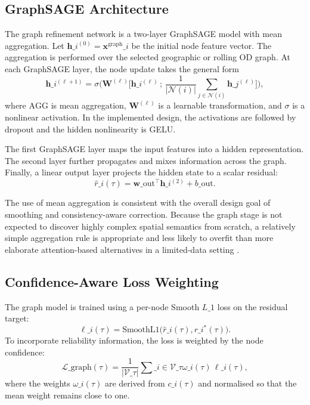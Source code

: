 \documentclass[12pt,a4paper]{report}
\begin{document}
\subsection{GraphSAGE Architecture}

The graph refinement network is a two-layer GraphSAGE model with mean aggregation. Let \(\mathbf{h}\_i^{(0)} = \mathbf{x}^{\text{graph}}\_i\) be the initial node feature vector.
The aggregation is performed over the selected geographic or rolling OD graph. At each GraphSAGE layer, the node update takes the general form
\[
\mathbf{h}\_i^{(\ell+1)}
=
\sigma\Big(
\mathbf{W}^{(\ell)}
\big[
\mathbf{h}\_i^{(\ell)} \, ; \,
\frac{1}{|\mathcal{N}(i)|}\sum_{j\in\mathcal{N}(i)} \mathbf{h}\_j^{(\ell)}
\big]
\Big),
\]
where \(\text{AGG}\) is mean aggregation, \(\mathbf{W}^{(\ell)}\) is a learnable transformation, and \(\sigma\) is a nonlinear activation. In the implemented design, the activations are followed by dropout and the hidden nonlinearity is GELU.

The first GraphSAGE layer maps the input features into a hidden representation. The second layer further propagates and mixes information across the graph. Finally, a linear output layer projects the hidden state to a scalar residual:
\[
\hat{r}\_i(\tau) = \mathbf{w}\_{\text{out}}^\top \mathbf{h}\_i^{(2)} + b\_{\text{out}}.
\]

The use of mean aggregation is consistent with the overall design goal of smoothing and consistency-aware correction. Because the graph stage is not expected to discover highly complex spatial semantics from scratch, a relatively simple aggregation rule is appropriate and less likely to overfit than more elaborate attention-based alternatives in a limited-data setting \cite{hamilton2017graphsage,jiang2022survey}.

\subsection{Confidence-Aware Loss Weighting}

The graph model is trained using a per-node Smooth \(L\_1\) loss on the residual target:
\[
\ell\_i(\tau)
=
\text{SmoothL1}\big(\hat{r}\_i(\tau), r\_i^*(\tau)\big).
\]
To incorporate reliability information, the loss is weighted by the node confidence:
\[
\mathcal{L}\_{\text{graph}}(\tau)
=
\frac{1}{|\mathcal{V}\_\tau|}
\sum\_{i \in \mathcal{V}\_\tau}
\omega\_i(\tau)\,\ell\_i(\tau),
\]
where the weights \(\omega\_i(\tau)\) are derived from \(c\_i(\tau)\) and normalised so that the mean weight remains close to one.
\end{document}
